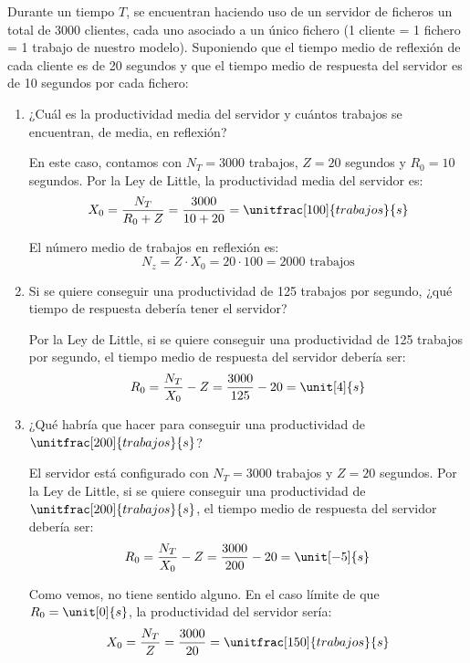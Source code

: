 \begin{ejercicio}\label{ej:5.10}
    Durante un tiempo $T$, se encuentran haciendo uso de un servidor de ficheros un total de 3000 clientes, cada uno asociado a un único fichero (1 cliente = 1 fichero = 1 trabajo de nuestro modelo). Suponiendo que el tiempo medio de reflexión de cada cliente es de 20 segundos y que el tiempo medio de respuesta del servidor es de 10 segundos por cada fichero:
    \begin{enumerate}
        \item ¿Cuál es la productividad media del servidor y cuántos trabajos se encuentran, de media, en reflexión?
        
        En este caso, contamos con $N_T=3000$ trabajos, $Z = 20$ segundos y $R_0 = 10$ segundos. Por la Ley de Little, la productividad media del servidor es:
        \begin{equation*}
            X_0 = \dfrac{N_T}{R_0+Z} = \dfrac{3000}{10+20} = \unitfrac[100]{trabajos}{s}
        \end{equation*}

        El número medio de trabajos en reflexión es:
        \begin{equation*}
            N_z = Z \cdot X_0 = 20 \cdot 100 = 2000 \text{ trabajos}
        \end{equation*}
        \item Si se quiere conseguir una productividad de 125 trabajos por segundo, ¿qué tiempo de respuesta debería tener el servidor?
        
        Por la Ley de Little, si se quiere conseguir una productividad de 125 trabajos por segundo, el tiempo medio de respuesta del servidor debería ser:
        \begin{equation*}
            R_0 = \dfrac{N_T}{X_0} - Z = \dfrac{3000}{125} - 20 = \unit[4]{s}
        \end{equation*}
        \item ¿Qué habría que hacer para conseguir una productividad de $\unitfrac[200]{trabajos}{s}$?
        
        El servidor está configurado con $N_T = 3000$ trabajos y $Z = 20$ segundos. Por la Ley de Little, si se quiere conseguir una productividad de $\unitfrac[200]{trabajos}{s}$, el tiempo medio de respuesta del servidor debería ser:
        \begin{equation*}
            R_0 = \dfrac{N_T}{X_0} - Z = \dfrac{3000}{200} - 20 = \unit[-5]{s}
        \end{equation*}

        Como vemos, no tiene sentido alguno. En el caso límite de que $R_0 = \unit[0]{s}$, la productividad del servidor sería:
        \begin{equation*}
            X_0 = \dfrac{N_T}{Z} = \dfrac{3000}{20} = \unitfrac[150]{trabajos}{s}
        \end{equation*}
    \end{enumerate}
\end{ejercicio}
